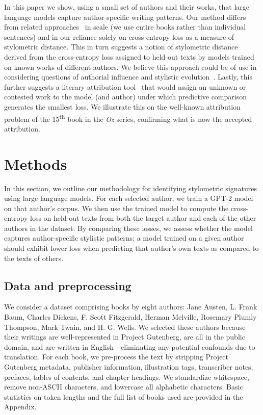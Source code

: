 \documentclass{llmxive}
\begin{document}
In this paper we show, using a small set of authors and their works, that large
language models capture author-specific writing patterns. Our method differs
from related approaches~\citep{Reza25} in scale (we use entire books rather
than individual sentences) and in our reliance solely on cross-entropy loss as
a measure of stylometric distance. This in turn suggests a notion of
stylometric distance derived from the cross-entropy loss assigned to held-out
texts by models trained on known works of different authors. We believe this
approach could be of use in considering questions of authorial influence and
stylistic evolution~\citep{HughEtal12}. Lastly, this further suggests a
literary attribution tool~\citep[a common use of stylometric techniques;
][]{MostWall63,MostWall84,NiloBino03,Juol08} that would assign an unknown or
contested work to the model (and author) under which predictive comparison
generates the smallest loss. We illustrate this on the well-known attribution
problem of the 15\textsuperscript{th} book in the \emph{Oz} series, confirming
what is now the accepted attribution.

\section{Methods}

In this section, we outline our methodology for identifying stylometric
signatures using large language models. For each selected author, we train a
GPT-2 model~\citep{RadfEtal19} on that author's corpus. We then use the trained
model to compute the cross-entropy loss on held-out texts from both the target
author and each of the other authors in the dataset. By comparing these losses,
we assess whether the model captures author-specific stylistic patterns: a
model trained on a given author should exhibit lower loss when predicting that
author's own texts as compared to the texts of others.

\subsection{Data and preprocessing \label{sec:data}}

We consider a dataset comprising books by eight authors: Jane Austen, L. Frank
Baum, Charles Dickens, F. Scott Fitzgerald, Herman Melville, Rosemary Plumly
Thompson, Mark Twain, and H. G. Wells. We selected these authors because their
writings are well-represented in Project Gutenberg, are all in the public
domain, and are written in English---eliminating any potential confounds due to
translation. For each book, we pre-process the text by stripping Project
Gutenberg metadata, publisher information, illustration tags, transcriber
notes, prefaces, tables of contents, and chapter headings. We standardize
whitespace, remove non-ASCII characters, and lowercase all alphabetic
characters. Basic statistics on token lengths and the full list of books used
are provided in the Appendix.
\end{document}
